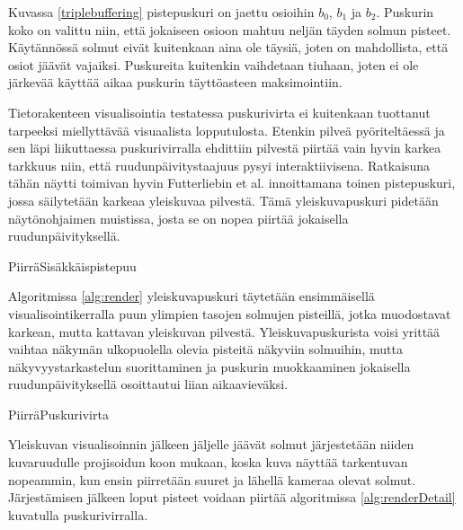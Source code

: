Kuvassa \ref{triplebuffering} pistepuskuri on jaettu osioihin $b_0$, $b_1$ ja $b_2$. Puskurin koko on valittu niin, että jokaiseen osioon mahtuu neljän täyden solmun pisteet. Käytännössä solmut eivät kuitenkaan aina ole täysiä, joten on mahdollista, että osiot jäävät vajaiksi. Puskureita kuitenkin vaihdetaan tiuhaan, joten ei ole järkevää käyttää aikaa puskurin täyttöasteen maksimointiin.

Tietorakenteen visualisointia testatessa puskurivirta ei kuitenkaan tuottanut tarpeeksi miellyttävää visuaalista lopputulosta. Etenkin pilveä pyöriteltäessä ja sen läpi liikuttaessa puskurivirralla ehdittiin pilvestä piirtää vain hyvin karkea tarkkuus niin, että ruudunpäivitystaajuus pysyi interaktiivisena. Ratkaisuna tähän näytti toimivan hyvin Futterliebin et al. \cite{smooth} innoittamana toinen pistepuskuri, jossa säilytetään karkeaa yleiskuvaa pilvestä. Tämä yleiskuvapuskuri pidetään näytönohjaimen muistissa, josta se on nopea piirtää jokaisella ruudunpäivityksellä. 

\begin{algorithm}[!h]
    \caption{PiirräSisäkkäispistepuu}
    \label{alg:render}
    
\end{algorithm}

Algoritmissa \ref{alg:render} yleiskuvapuskuri täytetään ensimmäisellä visualisointikerralla puun ylimpien tasojen solmujen pisteillä, jotka muodostavat karkean, mutta kattavan yleiskuvan pilvestä. Yleiskuvapuskurista voisi yrittää vaihtaa näkymän ulkopuolella olevia pisteitä näkyviin solmuihin, mutta näkyvyystarkastelun suorittaminen ja puskurin muokkaaminen jokaisella ruudunpäivityksellä osoittautui liian aikaavieväksi. 

\begin{algorithm}[!h]
    \caption{PiirräPuskurivirta}
    \label{alg:renderDetail}
    
\end{algorithm}

Yleiskuvan visualisoinnin jälkeen jäljelle jäävät solmut järjestetään niiden kuvaruudulle projisoidun koon mukaan, koska kuva näyttää tarkentuvan nopeammin, kun ensin piirretään suuret ja lähellä kameraa olevat solmut. Järjestämisen jälkeen loput pisteet voidaan piirtää algoritmissa \ref{alg:renderDetail} kuvatulla puskurivirralla. 

